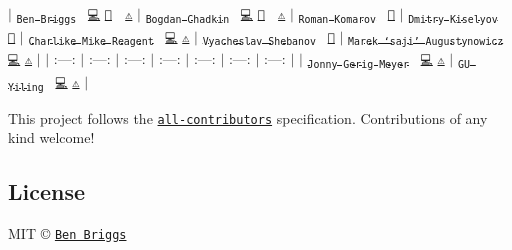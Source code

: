 $\vert$ \href{http://beneb.info}{\tt \textsubscript{Ben Briggs}}~\newline
\href{https://github.com/ben-eb/postcss-convert-values/commits?author=ben-eb}{\tt 💻} \href{https://github.com/ben-eb/postcss-convert-values/commits?author=ben-eb}{\tt 📖} 👀 \href{https://github.com/ben-eb/postcss-convert-values/commits?author=ben-eb}{\tt ⚠️} $\vert$ \href{https://github.com/TrySound}{\tt \textsubscript{Bogdan Chadkin}}~\newline
\href{https://github.com/ben-eb/postcss-convert-values/commits?author=TrySound}{\tt 💻} \href{https://github.com/ben-eb/postcss-convert-values/commits?author=TrySound}{\tt 📖} 👀 \href{https://github.com/ben-eb/postcss-convert-values/commits?author=TrySound}{\tt ⚠️} $\vert$ \href{http://kizu.ru/en/}{\tt \textsubscript{Roman Komarov}}~\newline
\href{https://github.com/ben-eb/postcss-convert-values/issues?q=author%3Akizu}{\tt 🐛} $\vert$ \href{http://codepen.io/dmitrykiselyov}{\tt \textsubscript{Dmitry Kiselyov}}~\newline
\href{https://github.com/ben-eb/postcss-convert-values/issues?q=author%3Admitrykiselyov}{\tt 🐛} $\vert$ \href{http://www.tunnckocore.tk}{\tt \textsubscript{Charlike Mike Reagent}}~\newline
\href{https://github.com/ben-eb/postcss-convert-values/commits?author=tunnckoCore}{\tt 💻} \href{https://github.com/ben-eb/postcss-convert-values/commits?author=tunnckoCore}{\tt ⚠️} $\vert$ \href{https://github.com/Termina1}{\tt \textsubscript{Vyacheslav Shebanov}}~\newline
\href{https://github.com/ben-eb/postcss-convert-values/commits?author=Termina1}{\tt 📖} $\vert$ \href{http://twitter.com/saji_}{\tt \textsubscript{Marek ‘saji’ Augustynowicz}}~\newline
\href{https://github.com/ben-eb/postcss-convert-values/commits?author=marek-saji}{\tt 💻} \href{https://github.com/ben-eb/postcss-convert-values/commits?author=marek-saji}{\tt ⚠️} $\vert$ $\vert$ \+:---\+: $\vert$ \+:---\+: $\vert$ \+:---\+: $\vert$ \+:---\+: $\vert$ \+:---\+: $\vert$ \+:---\+: $\vert$ \+:---\+: $\vert$ $\vert$ \href{www.oddbird.net}{\tt \textsubscript{Jonny Gerig Meyer}}~\newline
\href{https://github.com/ben-eb/postcss-convert-values/commits?author=jgerigmeyer}{\tt 💻} \href{https://github.com/ben-eb/postcss-convert-values/commits?author=jgerigmeyer}{\tt ⚠️} $\vert$ \href{http://lync.in/}{\tt \textsubscript{GU Yiling}}~\newline
\href{https://github.com/ben-eb/postcss-convert-values/commits?author=Justineo}{\tt 💻} \href{https://github.com/ben-eb/postcss-convert-values/commits?author=Justineo}{\tt ⚠️} $\vert$

This project follows the \href{https://github.com/kentcdodds/all-contributors}{\tt all-\/contributors} specification. Contributions of any kind welcome!

\subsection*{License}

M\+IT © \href{http://beneb.info}{\tt Ben Briggs} 